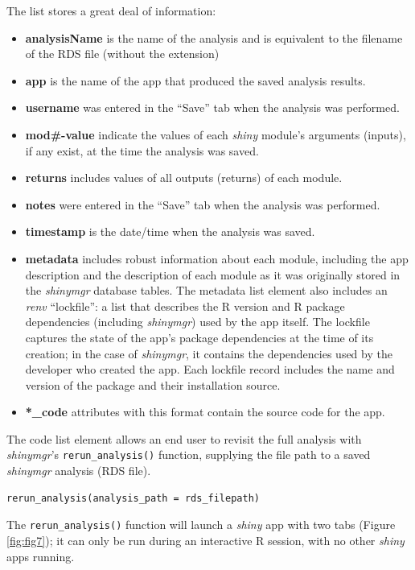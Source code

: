 The list stores a great deal of information:

\begin{itemize}
\tightlist
\item
  \textbf{analysisName} is the name of the analysis and is equivalent to the filename of the RDS file (without the extension)
\item
  \textbf{app} is the name of the app that produced the saved analysis results.
\item
  \textbf{username} was entered in the ``Save'' tab when the analysis was performed.
\item
  \textbf{mod\#-value} indicate the values of each \emph{shiny} module's arguments (inputs), if any exist, at the time the analysis was saved.
\item
  \textbf{returns} includes values of all outputs (returns) of each module.
\item
  \textbf{notes} were entered in the ``Save'' tab when the analysis was performed.
\item
  \textbf{timestamp} is the date/time when the analysis was saved.
\item
  \textbf{metadata} includes robust information about each module, including the app description and the description of each module as it was originally stored in the \emph{shinymgr} database tables. The metadata list element also includes an \emph{renv} ``lockfile'': a list that describes the R version and R package dependencies (including \emph{shinymgr}) used by the app itself. The lockfile captures the state of the app's package dependencies at the time of its creation; in the case of \emph{shinymgr}, it contains the dependencies used by the developer who created the app. Each lockfile record includes the name and version of the package and their installation source.
\item
  \textbf{*\_code} attributes with this format contain the source code for the app.
\end{itemize}

The code list element allows an end user to revisit the full analysis with \emph{shinymgr}'s \texttt{rerun\_analysis()} function, supplying the file path to a saved \emph{shinymgr} analysis (RDS file).

\begin{verbatim}
rerun_analysis(analysis_path = rds_filepath)
\end{verbatim}

The \texttt{rerun\_analysis()} function will launch a \emph{shiny} app with two tabs (Figure \ref{fig:fig7}); it can only be run during an interactive R session, with no other \emph{shiny} apps running.

